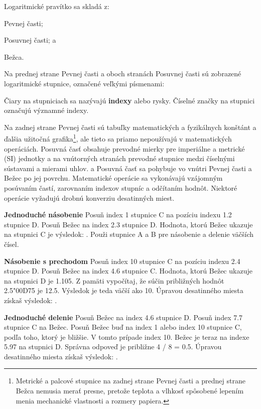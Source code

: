   \begin{multicols*}{3}
  \normalsize{
  Logaritmické pravítko sa skladá z:
    \begin{inparaenum}[a\upshape)]
      \item Pevnej časti;
      \item Posuvnej časti; a
      \item Bežca.
    \end{inparaenum}

  Na prednej strane Pevnej časti a oboch stranách Posuvnej časti sú zobrazené logaritmické stupnice, označené veľkými písmenami:

  
  Čiary na stupniciach sa nazývajú \textbf{indexy} alebo rysky. Číselné značky na stupnici označujú významné indexy.

  Na zadnej strane Pevnej časti sú tabuľky matematických a fyzikálnych konštánt a ďalšia užitočná grafika\footnote{Metrické a palcové stupnice na zadnej strane Pevnej časti a prednej strane Bežca nemusia merať presne, pretože teplota a vlhkosť spôsobené lepením menia mechanické vlastnosti a rozmery papiera.}, ale tieto sa priamo nepoužívajú v matematických operáciách. Posuvná časť  obsahuje prevodné mierky pre imperiálne a metrické (SI) jednotky a na vnútorných stranách prevodné stupnice medzi číselnými sústavami a mierami uhlov.
a
  Posuvná časť sa pohybuje vo vnútri Pevnej časti a Bežec po jej povrchu. Matematické operácie sa vykonávajú vzájomným posúvaním častí, zarovnaním indexov stupníc a odčítaním hodnôt. Niektoré operácie vyžadujú drobnú konverziu desatinných miest.

  \textbf{Jednoduché násobenie}
Posuň index 1 stupnice C na pozíciu indexu 1.2 stupnice D.
Posuň Bežec na index 2.3 stupnice D.
Hodnota, ktorú Bežec ukazuje na stupnici C je výsledok: .
\footnotesize Použi stupnice A a B pre násobenie a delenie väčších čísel.
\normalsize

  \textbf{Násobenie s prechodom}
Posuň index 10 stupnice C na pozíciu indexu 2.4 stupnice D.
Posuň Bežec na index 4.6 stupnice C.
Hodnota, ktorú Bežec ukazuje na stupnici D je 1.105.
Z pamäti vypočítaj, že súčin približných hodnôt 2.5{\char"00D7}5 je 12.5.
Výsledok je teda väčší ako 10.
Úpravou desatinného miesta získaš výsledok: . 

  \textbf{Jednoduché delenie}
Posuň Bežec na index 4.6 stupnice D.
Posuň index 7.7 stupnice C na Bežec.
Posuň Bežec buď na index 1 alebo index 10 stupnice C, podľa toho, ktorý je bližšie. V tomto prípade index 10.
Bežec je teraz na indexe 5.97 na stupnici D. Správna odpoveď je približne 4 / 8 = 0.5. Úpravou desatinného miesta získaš výsledok: .

}
\end{multicols*}

